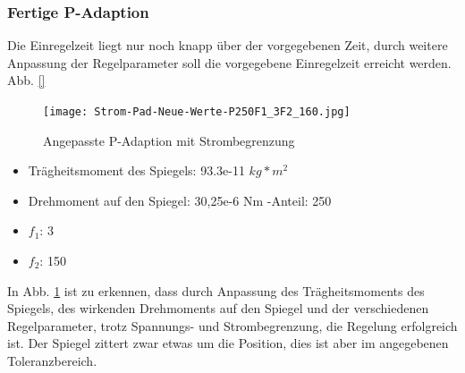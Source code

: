 \subsubsection{Fertige P-Adaption}
\label{chap:p_adaptionfertig}
Die Einregelzeit liegt nur noch knapp über der vorgegebenen Zeit, durch weitere Anpassung der Regelparameter soll die vorgegebene Einregelzeit erreicht werden.
Abb. \ref{}
\begin{figure}[!h]
	\centering
	\texttt{[image: Strom-Pad-Neue-Werte-P250F1\_3F2\_160.jpg]}
	\caption{Angepasste P-Adaption mit Strombegrenzung}
	\label{fig:strombegrenztpadsoll}
\end{figure}
\begin{itemize}
\item Trägheitsmoment des Spiegels: 93.3e-11 $kg*m^2$
\item Drehmoment auf den Spiegel: 30,25e-6 Nm
\itemP-Anteil: 250
\item $f_1$: 3
\item $f_2$: 150
\end{itemize}
In Abb. \ref{fig:strombegrenztpadsoll} ist zu erkennen, dass durch Anpassung des Trägheitsmoments des Spiegels, des wirkenden Drehmoments auf den Spiegel und der verschiedenen
Regelparameter, trotz Spannungs- und Strombegrenzung, die Regelung erfolgreich ist. 
Der Spiegel zittert zwar etwas um die Position, dies ist aber im angegebenen 
Toleranzbereich.

